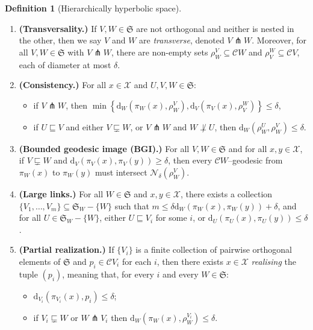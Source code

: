 \documentclass[svgnames]{amsart}
\theoremstyle{plain}
\theoremstyle{definition}
\newtheorem{defn}[thm]{Definition}
\newcommand{\cal}[1]{\mathcal{#1}}
\newcommand{\frakS}{\mathfrak{S}}
\newcommand{\C}{\cal C}
\newcommand{\dist}{\mathrm{d}}
\newcommand{\nest}{\sqsubseteq}
\newcommand{\propnest}{\sqsubsetneq}
\newcommand{\trans}{\pitchfork}
\begin{document}
\begin{defn}[Hierarchically hyperbolic space]
\begin{enumerate}[label=(\arabic*{})]
    \item \textbf{(Transversality.)}\label{axiom:transversality} If $V,W\in\frakS$ are not orthogonal and neither is nested in the other, then we say $V$ and $W$ are \emph{transverse}, denoted $V\trans W$.  Moreover, for all $V,W \in \frakS$ with $V\trans W$, there are non-empty sets $\rho^V_W\subseteq \C W$ and $\rho^W_V\subseteq \C  V$, each of diameter at most $\delta$.


    
    \item \textbf{(Consistency.)} \label{axiom:consistency} For all $x \in\cal X$ and $U,V,W\in\frakS$:
		\begin{itemize}
			\item  if $V\trans W$, then $\min\left\{\dist_{W}(\pi_W(x),\rho^V_W),\dist_{V}(\pi_V(x),\rho^W_V)\right\}\leq \delta$,
			\item if $U\nest V$ and either $V\propnest W$, or $V\trans W$ and $W\not\perp U$, then $\dist_W(\rho^U_W,\rho^V_W)\leq \delta$.
		\end{itemize}


\item \textbf{(Bounded geodesic image (BGI).)} \label{axiom:bounded_geodesic_image} For all  $V,W\in\frakS$ and for all $x,y \in \cal{X}$, if  $V\propnest W$ and $\dist_V(\pi_V(x),\pi_V(y)) \geq \delta$, then every $\C W$--geodesic from $\pi_W(x)$ to $\pi_W(y)$ must intersect $\cal{N}_\delta(\rho_W^V)$.

    \item \textbf{(Large links.)} \label{axiom:large_link_lemma} For all $W\in\frakS$ and  $x,y\in\cal X$, there exists a collection $\{V_1,\dots,V_m\}\subseteq\frakS_W -\{W\}$ such that $m\le \delta \dist_{W}(\pi_W(x),\pi_W(y))+\delta$, and for all $U\in\frakS_W - \{W\}$, either $U\nest V_i$ for some $i$, or $\dist_{U}(\pi_U(x),\pi_U(y)) \leq \delta$.  
		
    
		
    \item \textbf{(Partial realization.)} \label{axiom:partial_realisation}  If $\{V_i\}$ is a finite collection of pairwise orthogonal elements of $\frakS$ and $p_i\in  \C V_i$ for each $i$, then there exists $x\in \cal X$ \emph{realising} the tuple $(p_i)$, meaning that, for every $i$ and every $W\in \frakS$:
		\begin{itemize}
			\item $\dist_{V_i}(\pi_{V_{i}}(x),p_i)\leq \delta$;
			\item if $V_i\propnest W$ or $W\trans V_i$ then $\dist_{W}(\pi_W(x),\rho^{V_i}_W)\leq \delta$.
		\end{itemize}


\end{enumerate}
\end{defn}
\end{document}
